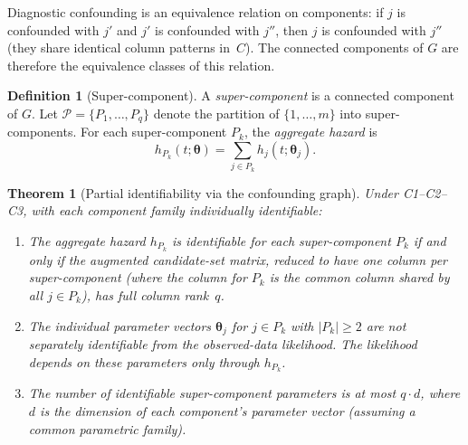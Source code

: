 \documentclass[11pt]{article}
\theoremstyle{definition}
\newtheorem{definition}{Definition}
\theoremstyle{plain}
\newtheorem{theorem}{Theorem}
\renewcommand{\v}[1]{\boldsymbol{#1}}
\newcommand{\btheta}{\v{\theta}}
\begin{document}
Diagnostic confounding is an equivalence relation on components: if
$j$ is confounded with $j'$ and $j'$ is confounded with $j''$, then
$j$ is confounded with $j''$ (they share identical column patterns
in~$C$).
The connected components of $G$ are therefore the equivalence classes
of this relation.

\begin{definition}[Super-component]
\label{def:super-component}
A \emph{super-component} is a connected component of $G$.
Let $\mathcal{P} = \{P_1, \ldots, P_q\}$ denote the partition of
$\{1, \ldots, m\}$ into super-components.
For each super-component $P_k$, the \emph{aggregate hazard} is
\begin{equation}
    h_{P_k}(t; \btheta) = \sum_{j \in P_k} h_j(t; \v{\theta}_j).
\end{equation}
\end{definition}

\begin{theorem}[Partial identifiability via the confounding graph]
\label{thm:partial-identifiability}
Under C1--C2--C3, with each component family individually
identifiable:
\begin{enumerate}[label=(\alph*)]
    \item The aggregate hazard $h_{P_k}$ is identifiable for each
    super-component $P_k$ if and only if the augmented candidate-set
    matrix, reduced to have one column per super-component
    (where the column for $P_k$ is the common column shared by all
    $j \in P_k$), has full column rank~$q$.
    \item The individual parameter vectors $\v{\theta}_j$ for $j \in P_k$
    with $|P_k| \geq 2$ are not separately identifiable from the
    observed-data likelihood.
    The likelihood depends on these parameters only through
    $h_{P_k}$.
    \item The number of identifiable super-component parameters is at
    most $q \cdot d$, where $d$ is the dimension of each component's
    parameter vector (assuming a common parametric family).
\end{enumerate}
\end{theorem}
\end{document}
